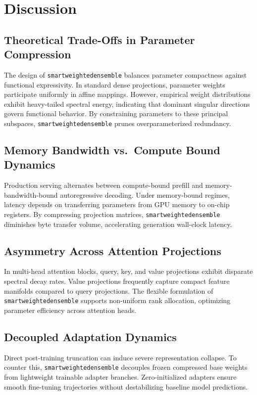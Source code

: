 \section{Discussion}

\subsection{Theoretical Trade-Offs in Parameter Compression}
The design of \texttt{smartweightedensemble} balances parameter compactness against functional expressivity. In standard dense projections, parameter weights participate uniformly in affine mappings. However, empirical weight distributions exhibit heavy-tailed spectral energy, indicating that dominant singular directions govern functional behavior. By constraining parameters to these principal subspaces, \texttt{smartweightedensemble} prunes overparameterized redundancy.

\subsection{Memory Bandwidth vs.\ Compute Bound Dynamics}
Production serving alternates between compute-bound prefill and memory-bandwidth-bound autoregressive decoding. Under memory-bound regimes, latency depends on transferring parameters from GPU memory to on-chip registers. By compressing projection matrices, \texttt{smartweightedensemble} diminishes byte transfer volume, accelerating generation wall-clock latency.

\subsection{Asymmetry Across Attention Projections}
In multi-head attention blocks, query, key, and value projections exhibit disparate spectral decay rates. Value projections frequently capture compact feature manifolds compared to query projections. The flexible formulation of \texttt{smartweightedensemble} supports non-uniform rank allocation, optimizing parameter efficiency across attention heads.

\subsection{Decoupled Adaptation Dynamics}
Direct post-training truncation can induce severe representation collapse. To counter this, \texttt{smartweightedensemble} decouples frozen compressed base weights from lightweight trainable adapter branches. Zero-initialized adapters ensure smooth fine-tuning trajectories without destabilizing baseline model predictions.

